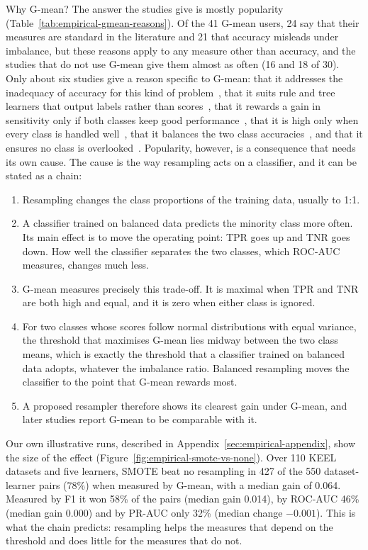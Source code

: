 Why G-mean? The answer the studies give is mostly popularity (Table~\ref{tab:empirical-gmean-reasons}). Of the 41 G-mean users, 24 say that their measures are standard in the literature and 21 that accuracy misleads under imbalance, but these reasons apply to any measure other than accuracy, and the studies that do not use G-mean give them almost as often (16 and 18 of 30). Only about six studies give a reason specific to G-mean: that it addresses the inadequacy of accuracy for this kind of problem~\parencite{kubat1998shrink}, that it suits rule and tree learners that output labels rather than scores~\parencite{napierala2010spider2}, that it rewards a gain in sensitivity only if both classes keep good performance~\parencite{das2015racog}, that it is high only when every class is handled well~\parencite{datta2020dlexiboost}, that it balances the two class accuracies~\parencite{maldonado2022fwsmote}, and that it ensures no class is overlooked~\parencite{wang2024mkc}. Popularity, however, is a consequence that needs its own cause. The cause is the way resampling acts on a classifier, and it can be stated as a chain:
\begin{enumerate}
  \item Resampling changes the class proportions of the training data, usually to 1:1.
  \item A classifier trained on balanced data predicts the minority class more often. Its main effect is to move the operating point: TPR goes up and TNR goes down. How well the classifier separates the two classes, which ROC-AUC measures, changes much less.
  \item G-mean measures precisely this trade-off. It is maximal when TPR and TNR are both high and equal, and it is zero when either class is ignored.
  \item For two classes whose scores follow normal distributions with equal variance, the threshold that maximises G-mean lies midway between the two class means, which is exactly the threshold that a classifier trained on balanced data adopts, whatever the imbalance ratio. Balanced resampling moves the classifier to the point that G-mean rewards most.
  \item A proposed resampler therefore shows its clearest gain under G-mean, and later studies report G-mean to be comparable with it.
\end{enumerate}



Our own illustrative runs, described in Appendix~\ref{sec:empirical-appendix}, show the size of the effect (Figure~\ref{fig:empirical-smote-vs-none}). Over 110 KEEL datasets and five learners, SMOTE beat no resampling in 427 of the 550 dataset-learner pairs (78\%) when measured by G-mean, with a median gain of 0.064. Measured by F1 it won 58\% of the pairs (median gain 0.014), by ROC-AUC 46\% (median gain 0.000) and by PR-AUC only 32\% (median change $-0.001$). This is what the chain predicts: resampling helps the measures that depend on the threshold and does little for the measures that do not.

